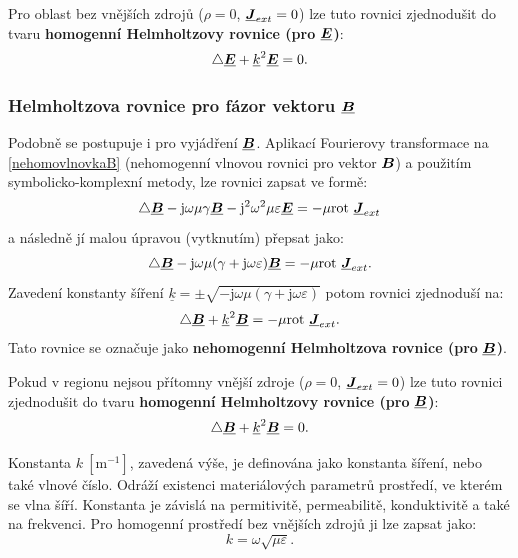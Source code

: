 \documentclass[12pt,a4paper,oneside]{article}
\numberwithin{equation}{section} %
\numberwithin{figure}{section} %
\numberwithin{table}{section} %
\newcommand{\mj}{\mathrm{j}} %
\renewcommand{\vec}[1]{\mbox{\boldmath$#1$}} %
\newcommand{\faz}[1]{{\underline{#1}}} %
\newcommand{\rot}{\mathrm{rot}\ }
\begin{document}
Pro oblast bez vnějších zdrojů ($\rho = 0$, $\faz{\vec{J}} _{ext} = 0$) lze tuto rovnici zjednodušit do tvaru \textbf{homogenní Helmholtzovy rovnice (pro} $\faz{\vec{E}}$\textbf{)}:
\begin{equation}
\label{homohelmholtze}
\triangle \faz{\vec{E}} + \faz{k} ^2 \faz{\vec{E}} = 0 .
\end{equation}

\subsubsection*{Helmholtzova rovnice pro fázor vektoru $\faz{\vec{B}}$}
Podobně se postupuje i pro vyjádření $\faz{\vec{B}}$. Aplikací Fourierovy transformace na \ref{nehomovlnovkaB} (nehomogenní vlnovou rovnici pro vektor $\vec{B}$) a použitím symbolicko-komplexní metody, lze rovnici zapsat ve formě:
\begin{equation}
\triangle \faz{\vec{B}} - \mj \omega \mu \gamma \faz{\vec{B}} - \mj ^2 \omega ^2 \mu \varepsilon \faz{\vec{E}} = - \mu \rot \faz{\vec{J}} _{ext}
\end{equation}
a následně jí malou úpravou (vytknutím) přepsat jako:
\begin{equation}
\triangle \faz{\vec{B}} - \mj \omega \mu (\gamma + \mj \omega \varepsilon) \faz{\vec{B}} = - \mu \rot \faz{\vec{J}} _{ext} .
\end{equation}
Zavedení konstanty šíření $\faz{k} = \pm \sqrt{- \mj \omega \mu (\gamma + \mj \omega \varepsilon)}$ potom rovnici zjednoduší na:
\begin{equation}
\triangle \faz{\vec{B}} + \faz{k} ^2 \faz{\vec{B}} = - \mu \rot \faz{\vec{J}} _{ext} .
\end{equation}
Tato rovnice se označuje jako \textbf{nehomogenní Helmholtzova rovnice (pro} $\faz{\vec{B}}$\textbf{)}.

Pokud v regionu nejsou přítomny vnější zdroje ($\rho = 0$, $\faz{\vec{J}} _{ext} = 0$) lze tuto rovnici zjednodušit do tvaru \textbf{homogenní Helmholtzovy rovnice (pro} $\faz{\vec{B}}$\textbf{)}:
\begin{equation}
\triangle \faz{\vec{B}} + \faz{k} ^2 \faz{\vec{B}} = 0 .
\end{equation}

Konstanta $k ~\mathrm{[m ^{-1}]}$, zavedená výše, je definována jako konstanta šíření, nebo také  vlnové číslo. Odráží existenci materiálových parametrů prostředí, ve kterém se vlna šíří. Konstanta je závislá na permitivitě, permeabilitě, konduktivitě a také na frekvenci. Pro homogenní prostředí bez vnějších zdrojů ji lze zapsat jako:
\begin{equation}
k = \omega \sqrt{\mu \varepsilon} .
\end{equation}
\end{document}
